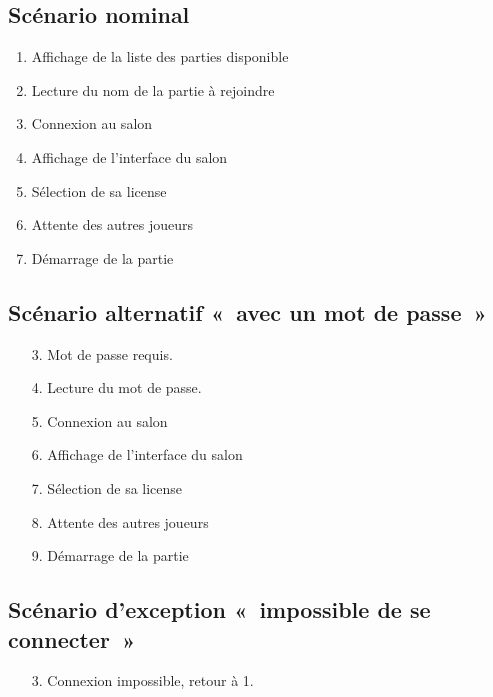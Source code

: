 \subsection{Scénario nominal}

\begin{enumerate}
    \item Affichage de la liste des parties disponible
    \item Lecture du nom de la partie à rejoindre
    \item Connexion au salon
    \item Affichage de l'interface du salon
    \item Sélection de sa license
    \item Attente des autres joueurs
    \item Démarrage de la partie
\end{enumerate}

\subsection{Scénario alternatif « avec un mot de passe »}

\begin{itemize}
    \item[3.] Mot de passe requis.
    \item[4.] Lecture du mot de passe.
    \item[5.] Connexion au salon
    \item[6.] Affichage de l'interface du salon
    \item[7.] Sélection de sa license
    \item[8.] Attente des autres joueurs
    \item[9.] Démarrage de la partie
\end{itemize}

\subsection{Scénario d'exception « impossible de se connecter »}

\begin{itemize}
    \item[3.] Connexion impossible, retour à 1.
\end{itemize}

